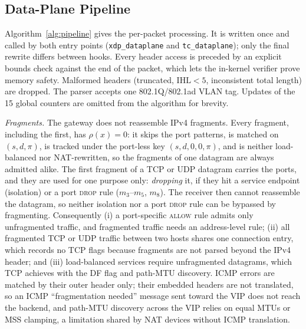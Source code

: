 \documentclass[conference]{IEEEtran}
\begin{document}
\subsection{Data-Plane Pipeline}
Algorithm~\ref{alg:pipeline} gives the per-packet processing. It is written
once and called by both entry points (\texttt{xdp\_dataplane} and
\texttt{tc\_dataplane}); only the final rewrite differs between hooks. Every
header access is preceded by an explicit bounds check against the end of the
packet, which lets the in-kernel verifier prove memory safety. Malformed
headers (truncated, $\mathrm{IHL}<5$, inconsistent total length) are dropped.
The parser accepts one 802.1Q/802.1ad VLAN tag. Updates of the 15 global
counters are omitted from the algorithm for brevity.

\textit{Fragments.} The gateway does not reassemble IPv4 fragments. Every
fragment, including the first, has $\rho(x)=0$: it skips the port patterns,
is matched on $(s,d,\pi)$, is tracked under the port-less key $(s,d,0,0,\pi)$,
and is neither load-balanced nor NAT-rewritten, so the fragments of one
datagram are always admitted alike. The first fragment of a TCP or UDP
datagram carries the ports, and they are used for one purpose only:
\emph{dropping} it, if they hit a service endpoint (isolation) or a port
\textsc{drop} rule ($m_3$--$m_5$, $m_8$). The receiver then cannot reassemble
the datagram, so neither isolation nor a port \textsc{drop} rule can be
bypassed by fragmenting. Consequently (i) a port-specific \textsc{allow} rule
admits only unfragmented traffic, and fragmented traffic needs an
address-level rule; (ii) all fragmented TCP or UDP traffic between two hosts
shares one connection entry, which records no TCP flags because fragments are
not parsed beyond the IPv4 header; and (iii) load-balanced services require
unfragmented datagrams, which TCP achieves with the DF flag and path-MTU
discovery. ICMP errors are matched by their outer header only; their embedded
headers are not translated, so an ICMP ``fragmentation needed'' message sent
toward the VIP does not reach the backend, and path-MTU discovery across the
VIP relies on equal MTUs or MSS clamping, a limitation shared by NAT devices
without ICMP translation.
\end{document}
